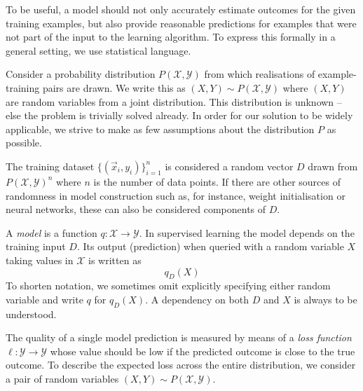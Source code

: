 \documentclass[
	twoside=false, %
]{kaobook}
\begin{document}
To be useful, a model should not only accurately estimate outcomes for the given training examples, but also provide reasonable predictions for examples that were not part of the input to the learning algorithm. To express this formally in a general setting, we use statistical language.

Consider a probability distribution $P(\mathcal{X}, \mathcal{Y})$ from which realisations of example-training pairs are drawn. We write this as $(X, Y) \sim P(\mathcal{X}, \mathcal{Y})$ where $(X,Y)$ are random variables from a joint distribution.
This distribution is unknown -- else the problem is trivially solved already. In order for our solution to be widely applicable, we strive to make as few assumptions about the distribution $P$ as possible. 

The training dataset $\{ (\vec{x}_{i}, y_{i}) \}_{i=1}^n$ is considered a random vector $D$ drawn from $P(\mathcal{X}, \mathcal{Y})^n$ where $n$ is the number of data points. If there are other sources of randomness in model construction such as, for instance, weight initialisation or neural networks, these can also be considered components of $D$.

\begin{definition}
A \textit{model} is a function $q: \mathcal{X} \to \mathcal{Y}$. In supervised learning the model depends on the training input $D$. Its output (prediction) when queried with a random variable $X$ taking values in $\mathcal{X}$ is written as
$$
q_{D}(X)
$$
To shorten notation, we sometimes omit explicitly specifying either random variable and write $q$ for $q_D(X)$. A dependency on both $D$ and $X$ is always to be understood.
\end{definition}


%
The quality of a single model prediction is measured by means of a \textit{loss function} $\ell: \mathcal{Y} \to \mathcal{Y}$ whose value should be low if the predicted outcome is close to the true outcome. 
To describe the expected loss across the entire distribution, we consider a pair of random variables $(X,Y) \sim P(\mathcal{X}, \mathcal{Y})$. 
\end{document}
